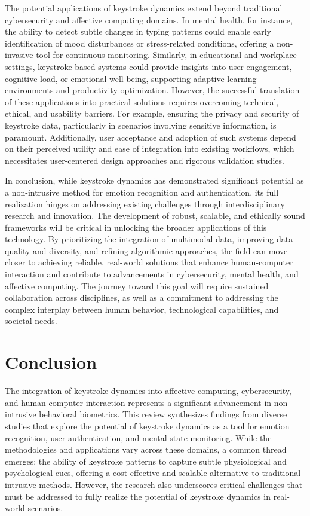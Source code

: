 \documentclass[conference]{IEEEtran}
\begin{document}
The potential applications of keystroke dynamics extend beyond traditional cybersecurity and affective computing domains. In mental health, for instance, the ability to detect subtle changes in typing patterns could enable early identification of mood disturbances or stress-related conditions, offering a non-invasive tool for continuous monitoring. Similarly, in educational and workplace settings, keystroke-based systems could provide insights into user engagement, cognitive load, or emotional well-being, supporting adaptive learning environments and productivity optimization. However, the successful translation of these applications into practical solutions requires overcoming technical, ethical, and usability barriers. For example, ensuring the privacy and security of keystroke data, particularly in scenarios involving sensitive information, is paramount. Additionally, user acceptance and adoption of such systems depend on their perceived utility and ease of integration into existing workflows, which necessitates user-centered design approaches and rigorous validation studies.

In conclusion, while keystroke dynamics has demonstrated significant potential as a non-intrusive method for emotion recognition and authentication, its full realization hinges on addressing existing challenges through interdisciplinary research and innovation. The development of robust, scalable, and ethically sound frameworks will be critical in unlocking the broader applications of this technology. By prioritizing the integration of multimodal data, improving data quality and diversity, and refining algorithmic approaches, the field can move closer to achieving reliable, real-world solutions that enhance human-computer interaction and contribute to advancements in cybersecurity, mental health, and affective computing. The journey toward this goal will require sustained collaboration across disciplines, as well as a commitment to addressing the complex interplay between human behavior, technological capabilities, and societal needs.

\section{Conclusion}

The integration of keystroke dynamics into affective computing, cybersecurity, and human-computer interaction represents a significant advancement in non-intrusive behavioral biometrics. This review synthesizes findings from diverse studies that explore the potential of keystroke dynamics as a tool for emotion recognition, user authentication, and mental state monitoring. While the methodologies and applications vary across these domains, a common thread emerges: the ability of keystroke patterns to capture subtle physiological and psychological cues, offering a cost-effective and scalable alternative to traditional intrusive methods. However, the research also underscores critical challenges that must be addressed to fully realize the potential of keystroke dynamics in real-world scenarios.  
\end{document}
